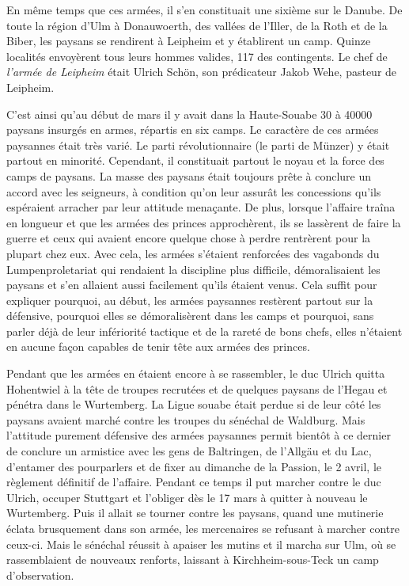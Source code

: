 \documentclass[french,twoside]{book} %
\begin{document}
En même temps que ces armées, il s’en constituait une sixième sur le Danube. De toute la région d’Ulm à Donauwoerth, des vallées de l’Iller, de la Roth et de la Biber, les paysans se rendirent à Leipheim et y établirent un camp. Quinze localités envoyèrent tous leurs hommes valides, 117 des contingents. Le chef de \emph{l’armée de Leipheim} était Ulrich Schön, son prédicateur Jakob Wehe, pasteur de Leipheim.\par
C’est ainsi qu’au début de mars il y avait dans la Haute-Souabe 30 à 40000 paysans insurgés en armes, répartis en six camps. Le caractère de ces armées paysannes était très varié. Le parti révolutionnaire (le parti de Münzer) y était partout en minorité. Cependant, il constituait partout le noyau et la force des camps de paysans. La masse des paysans était toujours prête à conclure un accord avec les seigneurs, à condition qu’on leur assurât les concessions qu’ils espéraient arracher par leur attitude menaçante. De plus, lorsque l’affaire traîna en longueur et que les armées des princes approchèrent, ils se lassèrent de faire la guerre et ceux qui avaient encore quelque chose à perdre rentrèrent pour la plupart chez eux. Avec cela, les armées s’étaient renforcées des vagabonds du Lumpenproletariat qui rendaient la discipline plus difficile, démoralisaient les paysans et s’en allaient aussi facilement qu’ils étaient venus. Cela suffit pour expliquer pourquoi, au début, les armées paysannes restèrent partout sur la défensive, pourquoi elles se démoralisèrent dans les camps et pourquoi, sans parler déjà de leur infériorité tactique et de la rareté de bons chefs, elles n’étaient en aucune façon capables de tenir tête aux armées des princes.\par
Pendant que les armées en étaient encore à se rassembler, le duc Ulrich quitta Hohentwiel à la tête de troupes recrutées et de quelques paysans de l’Hegau et pénétra dans le Wurtemberg. La Ligue souabe était perdue si de leur côté les paysans avaient marché contre les troupes du sénéchal de Waldburg. Mais l’attitude purement défensive des armées paysannes permit bientôt à ce dernier de conclure un armistice avec les gens de Baltringen, de l’Allgäu et du Lac, d’entamer des pourparlers et de fixer au dimanche de la Passion, le 2 avril, le règlement définitif de l’affaire. Pendant ce temps il put marcher contre le duc Ulrich, occuper Stuttgart et l’obliger dès le 17 mars à quitter à nouveau le Wurtemberg. Puis il allait se tourner contre les paysans, quand une mutinerie éclata brusquement dans son armée, les mercenaires se refusant à marcher contre ceux-ci. Mais le sénéchal réussit à apaiser les mutins et il marcha sur Ulm, où se rassemblaient de nouveaux renforts, laissant à Kirchheim-sous-Teck un camp d’observation.\par
\end{document}
